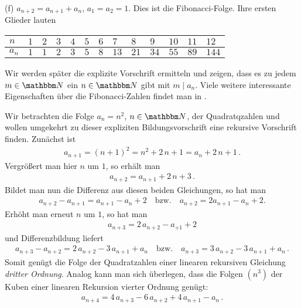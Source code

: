\documentclass[11pt,a4paper]{article}
\begin{document}
\begin{beispiel}
(f) $a_{n+2}=a_{n+1} +a_n$, $a_1=a_2=1$. Dies ist die {\sc Fibonacci}-Folge.
Ihre ersten Glieder lauten
\begin{center}
\begin{tabular}{l|llllllllllll}
$n$ & $1$ & $2$ & $3$ & $4$ & $5$ & $6$ & $7$ & $8$ & $9$ & $ 10$ & $11$ & $12 $
\\ \hline 
$a_n$ & $1$ & $1$ & $2$ & $3$ & $5$ & $8$ & $13$ & $21$ & $34$ & $55$ & $89$ & $144$
\end{tabular}
\end{center}

Wir werden später die explizite Vorschrift ermitteln und zeigen, dass es zu
jedem $m\in\N $ ein $n\in \N $ gibt mit $m\mid a_n$. Viele weitere interessante
Eigenschaften über die Fibonacci-Zahlen findet man in \cite{b-Worobjow}.

\end{beispiel}

\begin{beispiel} \label{b-2}
Wir betrachten die Folge $a_n=n^2$, $n\in \N $,  der Quadratqzahlen und wollen
umgekehrt zu dieser expliziten Bildungsvorschrift eine rekursive Vorschrift 
finden. Zunächst ist
\begin{gather*}
  a_{n+1}=(n+1)^2 =n^2 +2\,n +1= a_n +2\,n +1\,.
\end{gather*}
Vergrößert man hier $n$ um $1$, so erhält man
\begin{gather*}
  a_{n+2} =a_{n+1} +2\,n +3\,.
\end{gather*}
Bildet man nun die Differenz aus diesen beiden Gleichungen, so hat man
\begin{gather*}
  a_{n+2} -a_{n+1} = a_{n+1}- a_{n} +2 \quad\text{bzw.}\quad a_{n+2}=2a_{n+1} -
  a_n +2.
\end{gather*}
Erhöht man erneut $n$ um $1$, so hat man
\begin{gather*}
  a_{n+3}= 2\,a_{n+2} -a_{+1} +2
\end{gather*}
und Differenzbildung liefert
\begin{gather*}
  a_{n+3} - a_{n+2} = 2\,a_{n+2} -3\, a_{n+1} +a_n \quad\text{bzw.}\quad
  a_{n+3} = 3\, a_{n+2} -3\, a_{n+1} + a_n\,.
\end{gather*}
Somit genügt die Folge der Quadratzahlen einer linearen rekursiven Gleichung
\emph{dritter Ordnung}. Analog kann man sich überlegen, dass die Folgen $(n^3)$
der Kuben einer linearen Rekursion vierter Ordnung genügt:
\begin{gather*}
  a_{n+4} =4\,a_{n+3} -6\, a_{n+2} +4\, a_{n+1} - a_n\,.
\end{gather*}
\end{beispiel}
\end{document}

